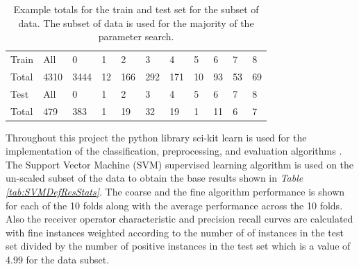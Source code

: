 \documentclass[ms]{nuthesis}
\begin{document}
\FloatBarrier
\begin{table}[H]
\centering
  \caption{Example totals for the train and test set for the subset of data. The subset of data is
  used for the majority of the parameter search.}
  \label{tab:subTrainTest}
  \begin{tabular}{|l||l||l||l||l||l||l||l||l||l||l|}\toprule
    Train & All & 0 & 1 & 2 & 3 & 4 & 5 & 6 & 7 & 8 \\
    Total & 4310 & 3444 & 12 & 166 & 292 & 171 & 10 & 93 & 53 & 69 \\ \midrule
    Test & All & 0 & 1 & 2 & 3 & 4 & 5 & 6 & 7 & 8 \\
    Total & 479 & 383 & 1 & 19 & 32 & 19 & 1 & 11 & 6 & 7 \\
 \bottomrule
  \end{tabular}
\end{table}
\FloatBarrier


\par Throughout this project the python library sci-kit learn is used for the implementation of the
classification, preprocessing, and evaluation algorithms \cite{scikit-learn}. The Support Vector Machine
(SVM) supervised learning algorithm is used on the un-scaled subset of the data to obtain the base
results shown in \textit{Table \ref{tab:SVMDefResStats}}. The coarse and the fine algorithm performance is shown for each
of the 10 folds along with the average performance across the 10 folds. Also the receiver operator characteristic
and precision recall curves are calculated with fine instances weighted according to the number of of instances in
the test set divided by the number of positive instances in the test set which is a value of 4.99 for the data subset.
\end{document}
